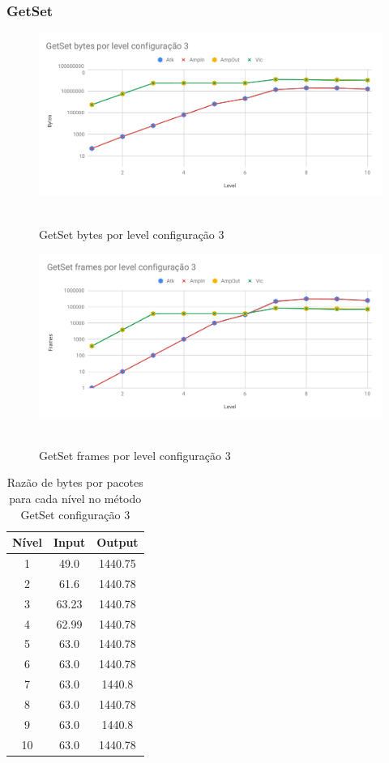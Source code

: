 \subsubsection{GetSet}

\begin{figure}[H]
     \centering
     \label{graf:GetSetBytes3}
     \includegraphics[scale=0.6]{img/capturas/GetSetBLC3.pdf}\
     \caption{GetSet bytes por level configuração 3}
\end{figure}

\begin{figure}[H]
     \centering
     \label{graf:GetSetFrames3}
     \includegraphics[scale=0.6]{img/capturas/GetSetFLC3.pdf}\
     \caption{GetSet frames por level configuração 3}
\end{figure}

\begin{table}[H]
\centering
\label{tab:bytespacsGetSet3}
\caption{Razão de bytes por pacotes para cada nível no método GetSet configuração 3}
\begin{tabular}{|c|c|c|}
\hline
Nível & Input & Output  \\ \hline
1     & 49.0  & 1440.75 \\ \hline
2     & 61.6  & 1440.78 \\ \hline
3     & 63.23 & 1440.78 \\ \hline
4     & 62.99 & 1440.78 \\ \hline
5     & 63.0  & 1440.78 \\ \hline
6     & 63.0  & 1440.78 \\ \hline
7     & 63.0  & 1440.8  \\ \hline
8     & 63.0  & 1440.78 \\ \hline
9     & 63.0  & 1440.8  \\ \hline
10    & 63.0  & 1440.78 \\ \hline
\end{tabular}
\end{table}

